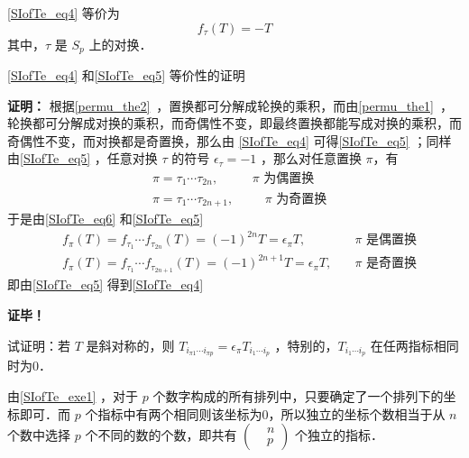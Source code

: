 \autoref{SIofTe_eq4} 等价为
\begin{equation}\label{SIofTe_eq5}
f_\tau(T)=-T
\end{equation}
其中，$\tau$ 是 $S_p$ 上的对换．
\begin{example}{}
\autoref{SIofTe_eq4} 和\autoref{SIofTe_eq5} 等价性的证明

\textbf{证明：}
根据\autoref{permu_the2}~，置换都可分解成轮换的乘积，而由\autoref{permu_the1}~，轮换都可分解成对换的乘积，而奇偶性不变，即最终置换都能写成对换的乘积，而奇偶性不变，而对换都是奇置换，那么由 \autoref{SIofTe_eq4} 可得\autoref{SIofTe_eq5} ；同样由\autoref{SIofTe_eq5} ，任意对换 $\tau$ 的符号 $\epsilon_\tau=-1$ ，那么对任意置换 $\pi$，有
\begin{equation}
\begin{aligned}
&\pi=\tau_1\cdots\tau_{2n}, \quad &\text{ $\pi$ 为偶置换}\\
&\pi=\tau_1\cdots\tau_{2n+1}, &\quad \text{ $\pi$ 为奇置换}
\end{aligned}
\end{equation}
于是由\autoref{SIofTe_eq6} 和\autoref{SIofTe_eq5} 
\begin{equation}
\begin{aligned}
&f_\pi(T)=f_{\tau_1}\cdots f_{\tau_{2n}}(T)=(-1)^{2n}T=\epsilon_\pi T,\quad&\text{$\pi$ 是偶置换}\\
&f_\pi(T)=f_{\tau_1}\cdots f_{\tau_{2n+1}}(T)=(-1)^{2n+1}T=\epsilon_\pi T,\quad&\text{$\pi$ 是奇置换}
\end{aligned}
\end{equation}
即由\autoref{SIofTe_eq5} 得到\autoref{SIofTe_eq4} 

\textbf{证毕！}

\end{example}






\begin{exercise}{}\label{SIofTe_exe1}
试证明：若 $T$ 是斜对称的，则 $T_{i_{\pi1}\cdots i_{\pi p}}=\epsilon_\pi T_{i_1\cdots i_p}$ ，特别的，$ T_{i_1\cdots i_p}$ 在任两指标相同时为0．
\end{exercise}

由\autoref{SIofTe_exe1} ，对于 $p$ 个数字构成的所有排列中，只要确定了一个排列下的坐标即可．而 $p$ 个指标中有两个相同则该坐标为0，所以独立的坐标个数相当于从 $n$ 个数中选择 $p$ 个不同的数的个数，即共有 $\left(\begin{aligned}
&n\\
&p
\end{aligned}\right)$
个独立的指标．

